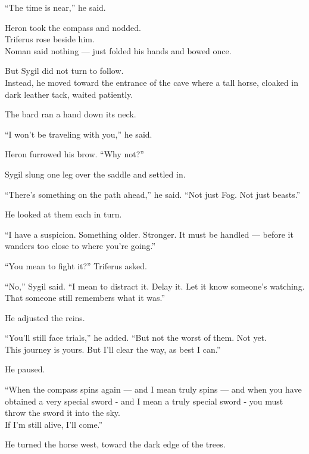 \documentclass[12pt]{article}
\begin{document}
\vspace{1em}

“The time is near,” he said.

Heron took the compass and nodded.\\
Triferus rose beside him.\\
Noman said nothing — just folded his hands and bowed once.

\vspace{1em}

But Sygil did not turn to follow.\\
Instead, he moved toward the entrance of the cave where a tall horse, cloaked in dark leather tack, waited patiently.

The bard ran a hand down its neck.

“I won’t be traveling with you,” he said.

Heron furrowed his brow. “Why not?”

Sygil slung one leg over the saddle and settled in.

“There’s something on the path ahead,” he said. “Not just Fog. Not just beasts.”

He looked at them each in turn.

“I have a suspicion. Something older. Stronger. It must be handled — before it wanders too close to where you’re going.”

“You mean to fight it?” Triferus asked.

“No,” Sygil said. “I mean to distract it. Delay it. Let it know someone’s watching.\\
That someone still remembers what it was.”

\vspace{1em}

He adjusted the reins.

“You’ll still face trials,” he added. “But not the worst of them. Not yet.\\
This journey is yours. But I’ll clear the way, as best I can.”

He paused.

“When the compass spins again — and I mean truly spins — and when you have obtained a very special sword - and I mean a truly special sword - you must throw the sword it into the sky.\\
If I’m still alive, I’ll come.”

\vspace{1em}

He turned the horse west, toward the dark edge of the trees.
\end{document}
